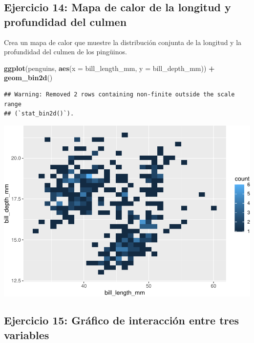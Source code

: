 \documentclass[
]{book}
\newenvironment{Shaded}{\begin{snugshade}}{\end{snugshade}}
\newcommand{\AttributeTok}[1]{\textcolor[rgb]{0.13,0.29,0.53}{#1}}
\newcommand{\FunctionTok}[1]{\textcolor[rgb]{0.13,0.29,0.53}{\textbf{#1}}}
\newcommand{\NormalTok}[1]{#1}
\newcommand{\SpecialCharTok}[1]{\textcolor[rgb]{0.81,0.36,0.00}{\textbf{#1}}}
\begin{document}
\hypertarget{ejercicio-14-mapa-de-calor-de-la-longitud-y-profundidad-del-culmen-1}{%
\subsection{Ejercicio 14: Mapa de calor de la longitud y profundidad del culmen}\label{ejercicio-14-mapa-de-calor-de-la-longitud-y-profundidad-del-culmen-1}}

Crea un mapa de calor que muestre la distribución conjunta de la longitud y la profundidad del culmen de los pingüinos.

\begin{Shaded}
\begin{Highlighting}[]
\FunctionTok{ggplot}\NormalTok{(penguins, }\FunctionTok{aes}\NormalTok{(}\AttributeTok{x =}\NormalTok{ bill\_length\_mm, }\AttributeTok{y =}\NormalTok{ bill\_depth\_mm)) }\SpecialCharTok{+}
  \FunctionTok{geom\_bin2d}\NormalTok{()}
\end{Highlighting}
\end{Shaded}

\begin{verbatim}
## Warning: Removed 2 rows containing non-finite outside the scale range
## (`stat_bin2d()`).
\end{verbatim}

\includegraphics{bookdown-demo_files/figure-latex/unnamed-chunk-213-1.pdf}

\hypertarget{ejercicio-15-gruxe1fico-de-interacciuxf3n-entre-tres-variables-1}{%
\subsection{Ejercicio 15: Gráfico de interacción entre tres variables}\label{ejercicio-15-gruxe1fico-de-interacciuxf3n-entre-tres-variables-1}}
\end{document}
